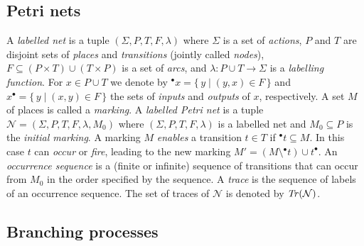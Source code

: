 \documentclass{llncs}
\newcommand{\inp}[1]{{}^\bullet\!{#1}}
\newcommand{\out}[1]{{#1}^\bullet}
\def\N{\mathcal{N}}
\newcommand{\Tr}[1]{{\it Tr}(#1)}
\begin{document}
\subsection{Petri nets}

A \emph{labelled net} is a tuple $(\Sigma, P,T,F,\lambda)$ where $\Sigma$ is a set of {\em actions}, $P$ and $T$ are 
disjoint sets of \emph{places} and \emph{transitions} (jointly called \emph{nodes}), $F\subseteq (P\times T)\cup (T\times P)$ is a set
of {\em arcs}, and $\lambda \colon P \cup T \rightarrow \Sigma$ is a {\em labelling
function}. For $x\in P\cup T$ we denote by $\inp{x}=\{\,y\mid(y,x)\in F\,\}$ and $\out{x}=\{\,y\mid(x,y)\in F\,\}$ the sets of \emph{inputs} and \emph{outputs} of $x$, respectively. A set $M$ of places is called a \emph{marking}.  
A \emph{labelled Petri net} is a tuple $\N=(\Sigma,P,T,F,\lambda,M_0)$ where $(\Sigma,P,T,F,\lambda)$ is a labelled net and $M_0\subseteq P$ is the \emph{initial marking}.
A marking $M$ \emph{enables} a transition $t\in T$ if $\inp{t}\subseteq M$.
In this case $t$ can \emph{occur} or \emph{fire}, leading to the new marking $M'=(M\setminus\inp{t})\cup\out{t}$.
An \emph{occurrence sequence} is a (finite or infinite) sequence of transitions that can occur from $M_0$ in the 
order specified by the sequence. A \emph{trace} is the sequence of labels of an occurrence 
sequence. The set of traces of $\N$ is denoted by $\Tr{\N}$.

\subsection{Branching processes}
\end{document}
